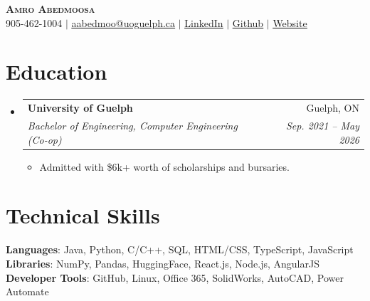 \documentclass[letterpaper,11pt]{article}
\makeatletter
\newcommand{\resumeItem}[1]{
  \item\small{
    {#1 \vspace{-2pt}}
  }
}
\newcommand{\resumeSubheading}[4]{
  \vspace{-2pt}\item
    \begin{tabular*}{0.97\textwidth}[t]{l@{\extracolsep{\fill}}r}
      \textbf{#1} & #2 \\
      \textit{\small#3} & \textit{\small #4} \\
    \end{tabular*}\vspace{-7pt}
}
\newcommand{\resumeSubHeadingListStart}{\begin{itemize}[leftmargin=0.15in, label={}]}
\newcommand{\resumeSubHeadingListEnd}{\end{itemize}}
\newcommand{\resumeItemListStart}{\begin{itemize}}
\newcommand{\resumeItemListEnd}{\end{itemize}\vspace{-5pt}}
\makeatother
\begin{document}

\begin{center}
    \textbf{\Huge \scshape Amro Abedmoosa} \\ \vspace{1pt}
    \small 905-462-1004 $|$ \href{mailto:aabedmoo@uguelph.ca}{\underline{aabedmoo@uoguelph.ca}} $|$ 
    \href{https://linkedin.com/in/amro-abedmoosa/}{\underline{LinkedIn}} $|$
    \href{https://github.com/amro212}{\underline{Github}}
    $|$
    \href{https://amro212.github.io/amro.portfolio/}{\underline{Website}}
\end{center}




\section{Education}
  \resumeSubHeadingListStart
    \resumeSubheading
      {University of Guelph}{Guelph, ON}
      {Bachelor of Engineering, Computer Engineering (Co-op)}{Sep. 2021 -- May 2026}
      \resumeItemListStart
            \resumeItem{Admitted with \$6k+ worth of scholarships and bursaries.}
      \resumeItemListEnd
  \resumeSubHeadingListEnd

\section{Technical Skills}
 \begin{itemize}[leftmargin=0.15in, label={}]
    \small{\item{
     \textbf{Languages}{: Java, Python, C/C++, SQL, HTML/CSS, TypeScript, JavaScript}\\
     \textbf{Libraries}{: NumPy, Pandas, HuggingFace, React.js, Node.js, AngularJS}\\
     \textbf{Developer Tools}{: GitHub, Linux, Office 365, SolidWorks, AutoCAD, Power Automate}}}
 \end{itemize}


\end{document}
